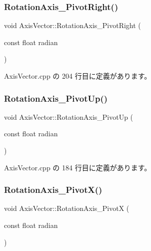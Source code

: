 \subsubsection{\texorpdfstring{Rotation\+Axis\+\_\+\+Pivot\+Right()}{RotationAxis\_PivotRight()}}
{\footnotesize\ttfamily void Axis\+Vector\+::\+Rotation\+Axis\+\_\+\+Pivot\+Right (\begin{DoxyParamCaption}\item[{const float}]{radian }\end{DoxyParamCaption})}



 Axis\+Vector.\+cpp の 204 行目に定義があります。

\mbox{\label{class_axis_vector_ad33eef7f1b3912b6a1d0eaa18fff8f29}} 
\subsubsection{\texorpdfstring{Rotation\+Axis\+\_\+\+Pivot\+Up()}{RotationAxis\_PivotUp()}}
{\footnotesize\ttfamily void Axis\+Vector\+::\+Rotation\+Axis\+\_\+\+Pivot\+Up (\begin{DoxyParamCaption}\item[{const float}]{radian }\end{DoxyParamCaption})}



 Axis\+Vector.\+cpp の 184 行目に定義があります。

\mbox{\label{class_axis_vector_ad3110d0a45e303109caa1e0dfb2ca027}} 
\subsubsection{\texorpdfstring{Rotation\+Axis\+\_\+\+Pivot\+X()}{RotationAxis\_PivotX()}}
{\footnotesize\ttfamily void Axis\+Vector\+::\+Rotation\+Axis\+\_\+\+PivotX (\begin{DoxyParamCaption}\item[{const float}]{radian }\end{DoxyParamCaption})}



